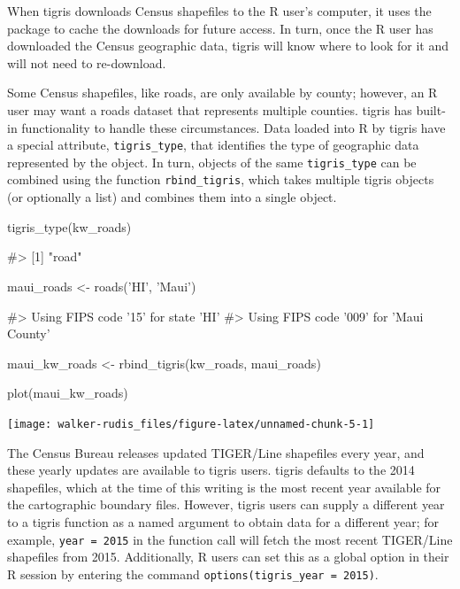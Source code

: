 When tigris downloads Census shapefiles to the R user's computer, it
uses the  package to cache the downloads for future
access. In turn, once the R user has downloaded the Census geographic
data, tigris will know where to look for it and will not need to
re-download.

Some Census shapefiles, like roads, are only available by county;
however, an R user may want a roads dataset that represents multiple
counties. tigris has built-in functionality to handle these
circumstances. Data loaded into R by tigris have a special attribute,
\texttt{tigris\_type}, that identifies the type of geographic data
represented by the object. In turn, objects of the same
\texttt{tigris\_type} can be combined using the function
\texttt{rbind\_tigris}, which takes multiple tigris objects (or
optionally a list) and combines them into a single object.

\begin{Schunk}
\begin{Sinput}
tigris_type(kw_roads)
\end{Sinput}
\begin{Soutput}
#> [1] "road"
\end{Soutput}
\end{Schunk}

\begin{Schunk}
\begin{Sinput}
maui_roads <- roads('HI', 'Maui')
\end{Sinput}
\begin{Soutput}
#> Using FIPS code '15' for state 'HI'
#> Using FIPS code '009' for 'Maui County'
\end{Soutput}
\begin{Sinput}
maui_kw_roads <- rbind_tigris(kw_roads, maui_roads)

plot(maui_kw_roads)
\end{Sinput}

\texttt{[image: walker-rudis\_files/figure-latex/unnamed-chunk-5-1]} \end{Schunk}

The Census Bureau releases updated TIGER/Line shapefiles every year, and
these yearly updates are available to tigris users. tigris defaults to
the 2014 shapefiles, which at the time of this writing is the most
recent year available for the cartographic boundary files. However,
tigris users can supply a different year to a tigris function as a named
argument to obtain data for a different year; for example,
\texttt{year\ =\ 2015} in the function call will fetch the most recent
TIGER/Line shapefiles from 2015. Additionally, R users can set this as a
global option in their R session by entering the command
\texttt{options(tigris\_year\ =\ 2015)}.


